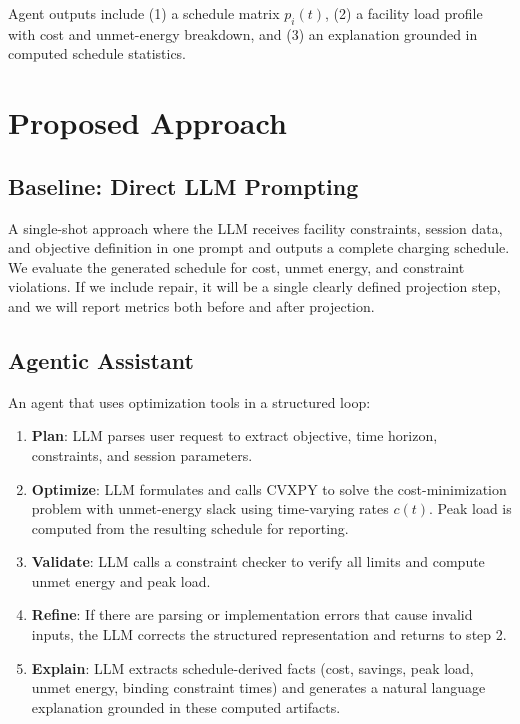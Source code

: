 \documentclass{article}
\begin{document}
Agent outputs include (1) a schedule matrix $p_i(t)$, (2) a facility load profile with cost and unmet-energy breakdown, and (3) an explanation grounded in computed schedule statistics.

\section{Proposed Approach}

\subsection{Baseline: Direct LLM Prompting}
A single-shot approach where the LLM receives facility constraints, session data, and objective definition in one prompt and outputs a complete charging schedule. We evaluate the generated schedule for cost, unmet energy, and constraint violations. If we include repair, it will be a single clearly defined projection step, and we will report metrics both before and after projection.

\subsection{Agentic Assistant}
An agent that uses optimization tools in a structured loop:

\begin{enumerate}
  \item \textbf{Plan}: LLM parses user request to extract objective, time horizon, constraints, and session parameters.
  
  \item \textbf{Optimize}: LLM formulates and calls CVXPY to solve the cost-minimization problem with unmet-energy slack using time-varying rates $c(t)$. Peak load is computed from the resulting schedule for reporting.
  
  \item \textbf{Validate}: LLM calls a constraint checker to verify all limits and compute unmet energy and peak load.
  
  \item \textbf{Refine}: If there are parsing or implementation errors that cause invalid inputs, the LLM corrects the structured representation and returns to step 2.
  
  \item \textbf{Explain}: LLM extracts schedule-derived facts (cost, savings, peak load, unmet energy, binding constraint times) and generates a natural language explanation grounded in these computed artifacts.
\end{enumerate}
\end{document}
